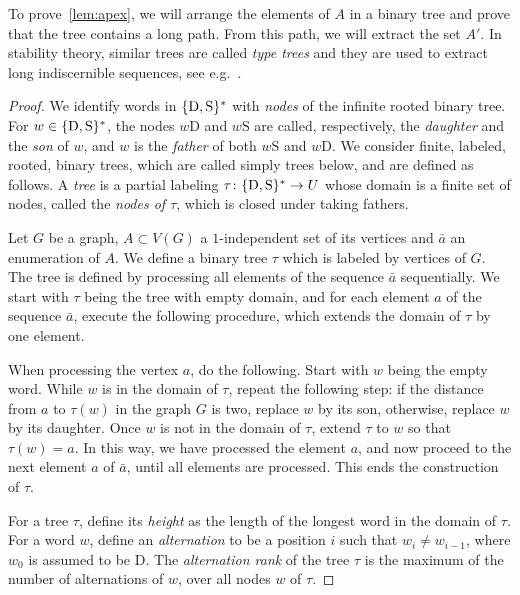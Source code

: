 To prove~\cref{lem:apex}, we will arrange the elements of $A$ in a binary tree
and prove that the tree contains a long path. From this path, we will 
extract the set $A'$. In stability theory, similar trees are called \emph{type trees} and they are used to extract long indiscernible sequences, see e.g.~\cite{malliaris2014regularity}. 

\begin{proof}
	\newcommand{\dau}{\mathrm{D}}
	\newcommand{\son}{\mathrm{S}}
	
	We identify words in $\set{\dau,\son}^*$ with \emph{nodes}
	of the infinite rooted binary tree. For $w\in \set{\dau,\son}^*$,
	 the nodes $w\dau$ and $w\son$ are called, respectively, the \emph{daughter} and the \emph{son} of $w$,
	and $w$ is the \emph{father} of both $w\son$ and $w\dau$.
	We consider
	 finite, labeled, rooted, binary trees, which are called simply trees below, and are defined as follows.
	 A \emph{tree} is a partial labeling $\tau\from \set{\dau,\son}^*\to U$ whose domain is a finite set of nodes, called the \emph{nodes of $\tau$}, which is closed under taking fathers.
  
  Let $G$ be a graph, $A\subset V(G)$ a $1$-independent set of its vertices
  and $\bar a$ an enumeration of $A$.
We define  a binary tree $\tau$ which is 
  labeled by vertices of $G$. The tree is defined by processing all elements of the sequence $\bar a$ sequentially. We start with $\tau$ being the  tree with empty domain, and for each element $a$ of the sequence $\bar a$, execute the following procedure, which extends the domain of $\tau$ by one element.
  
When processing the vertex $a$, do the following. Start with $w$ being the empty word. While $w$ is in the domain of $\tau$, repeat the following step: 
  if the distance from $a$ to $\tau(w)$ in the graph 
  $G$ is two, replace $w$ by its son, otherwise, replace $w$ by its daughter.
  Once $w$ is not in the domain of $\tau$, extend $\tau$ to $w$    so that  $\tau(w)=a$. In this way, we have processed the element $a$, and now
    proceed to the next element $a$ of $\bar a$, until all elements are processed. This ends the construction of $\tau$.
	
  
  
  
  \medskip
For a tree $\tau$, define its
\emph{height} as 
the length of the longest word in the domain of $\tau$.
For a word $w$, define an \emph{alternation} to be 
a position $i$ such that $w_i\neq w_{i-1}$, where $w_0$ is assumed to be $\dau$.
 The \emph{alternation rank} of the tree $\tau$ is the maximum of the number of alternations of $w$, over all nodes $w$ of $\tau$.



\end{proof}
